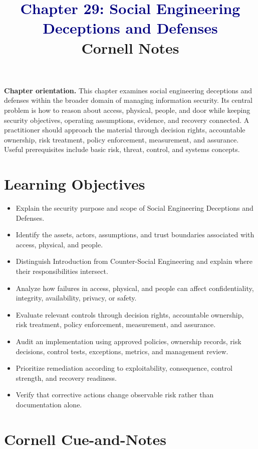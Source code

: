 \documentclass[11pt]{article}
\title{\textcolor{Navy}{Chapter 29: Social Engineering Deceptions and Defenses}\\[2mm]\large Cornell Notes}
\author{}
\date{}
\begin{document}
\maketitle
\thispagestyle{fancy}
\vspace{-1.5em}
\begin{orientationbox}
\textbf{Chapter orientation.} This chapter examines social engineering deceptions and defenses within the broader domain of managing information security. Its central problem is how to reason about access, physical, people, and door while keeping security objectives, operating assumptions, evidence, and recovery connected. A practitioner should approach the material through decision rights, accountable ownership, risk treatment, policy enforcement, measurement, and assurance. Useful prerequisites include basic risk, threat, control, and systems concepts.
\end{orientationbox}
\section*{Learning Objectives}
\begin{itemize}
\item Explain the security purpose and scope of Social Engineering Deceptions and Defenses.
\item Identify the assets, actors, assumptions, and trust boundaries associated with access, physical, and people.
\item Distinguish Introduction from Counter-Social Engineering and explain where their responsibilities intersect.
\item Analyze how failures in access, physical, and people can affect confidentiality, integrity, availability, privacy, or safety.
\item Evaluate relevant controls through decision rights, accountable ownership, risk treatment, policy enforcement, measurement, and assurance.
\item Audit an implementation using approved policies, ownership records, risk decisions, control tests, exceptions, metrics, and management review.
\item Prioritize remediation according to exploitability, consequence, control strength, and recovery readiness.
\item Verify that corrective actions change observable risk rather than documentation alone.
\end{itemize}
\section*{Cornell Cue-and-Notes}
\end{document}

